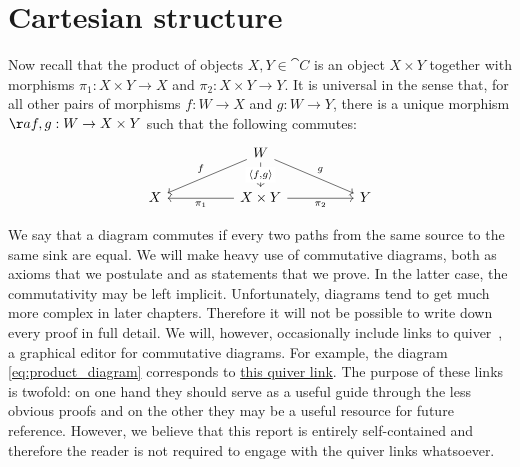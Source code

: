 \section{Cartesian structure}\label{sec:cartesian_categories}

Now recall that the product of objects $X,Y\in\cat{C}$ is an object $X\times Y$
together with morphisms $\pi_1 : X\times Y \to X$ and $\pi_2 : X\times Y \to
Y$. It is universal in the sense that, for all other pairs of morphisms $f:W\to
X$ and $g:W\to Y$, there is a unique morphism $\aa{f,g}:W\to X\times Y$ such
that the following commutes:
\begin{equation}\label{eq:product_diagram}
  \begin{tikzcd}
  && W \\
    X && {X\times Y} && Y
    \arrow["{\pi_2}"', from=2-3, to=2-5]
    \arrow["{\pi_1}", from=2-3, to=2-1]
    \arrow["{\langle f,g\rangle}"{description}, from=1-3, to=2-3]
    \arrow["f"', from=1-3, to=2-1]
    \arrow["g", from=1-3, to=2-5]
  \end{tikzcd}
\end{equation}

We say that a diagram commutes if every two paths from the same source to the
same sink are equal. We will make heavy use of commutative diagrams, both as
axioms that we postulate and as statements that we prove. In the latter case,
the commutativity may be left implicit. Unfortunately, diagrams tend to get
much more complex in later chapters. Therefore it will not be possible to write
down every proof in full detail. We will, however, occasionally include links
to quiver~\cite{quiver}, a graphical editor for commutative diagrams. For
example, the diagram \ref{eq:product_diagram} corresponds to \href{
  https://q.uiver.app/?q=WzAsNCxbMiwwLCJXIl0sWzIsMSwiWFxcdGltZXMgWSJdLFswLDEsIlgiXSxbNCwxLCJZIl0sWzEsMywiXFxwaV8yIiwyXSxbMSwyLCJcXHBpXzEiXSxbMCwxLCJcXGxhbmdsZSBmLGdcXHJhbmdsZSIsMV0sWzAsMiwiZiIsMl0sWzAsMywiZyJdXQ==
}{this quiver link}. The purpose of these links is twofold: on one hand they
should serve as a useful guide through the less obvious proofs and on the other
they may be a useful resource for future reference. However,
we believe that this report is entirely self-contained and therefore the reader
is not required to engage with the quiver links whatsoever.

